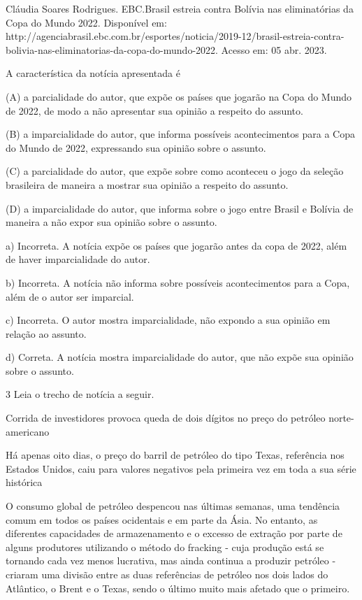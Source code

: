 \begin{itemize}
\begin{itemize}
{\begin{itemize}
\begin{itemize}
Cláudia Soares Rodrigues. EBC.Brasil estreia contra Bolívia nas
eliminatórias da Copa do Mundo 2022. Disponível em:
http://agenciabrasil.ebc.com.br/esportes/noticia/2019-12/brasil-estreia-contra-bolivia-nas-eliminatorias-da-copa-do-mundo-2022.
Acesso em: 05 abr. 2023.

A característica da notícia apresentada é

(A) a parcialidade do autor, que expõe os países que jogarão na Copa do
Mundo de 2022, de modo a não apresentar sua opinião a respeito do
assunto.

(B) a imparcialidade do autor, que informa possíveis acontecimentos para
a Copa do Mundo de 2022, expressando sua opinião sobre o assunto.

(C) a parcialidade do autor, que expõe sobre como aconteceu o jogo da
seleção brasileira de maneira a mostrar sua opinião a respeito do
assunto.

(D) a imparcialidade do autor, que informa sobre o jogo entre Brasil e
Bolívia de maneira a não expor sua opinião sobre o assunto.


a) Incorreta. A notícia expõe os países que jogarão antes da copa de
2022, além de haver imparcialidade do autor.

b) Incorreta. A notícia não informa sobre possíveis acontecimentos para
a Copa, além de o autor ser imparcial.

c) Incorreta. O autor mostra imparcialidade, não expondo a sua opinião
em relação ao assunto.

d) Correta. A notícia mostra imparcialidade do autor, que não expõe sua
opinião sobre o assunto.

\num{3} Leia o trecho de notícia a seguir.

Corrida de investidores provoca queda de dois dígitos no preço do
petróleo norte-americano

Há apenas oito dias, o preço do barril de petróleo do tipo Texas,
referência nos Estados Unidos, caiu para valores negativos pela primeira
vez em toda a sua série histórica

O consumo global de petróleo despencou nas últimas semanas, uma
tendência comum em todos os países ocidentais e em parte da Ásia. No
entanto, as diferentes capacidades de armazenamento e o excesso de
extração por parte de alguns produtores utilizando o método do fracking
- cuja produção está se tornando cada vez menos lucrativa, mas ainda
continua a produzir petróleo - criaram uma divisão entre as duas
referências de petróleo nos dois lados do Atlântico, o Brent e o Texas,
sendo o último muito mais afetado que o primeiro.


\end{itemize}
\end{itemize}}
\end{itemize}
\end{itemize}
